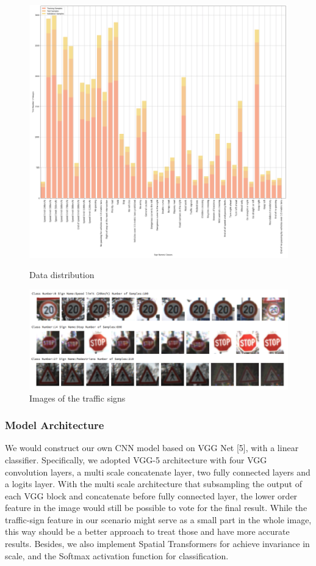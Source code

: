 \documentclass{article}
\begin{document}
\begin{figure}[ht]
  \centering
  \begin{minipage}{.5\textwidth}
    \includegraphics[width=1\linewidth]{data_distribution.png}
    \caption{Data distribution}
    \label{fig:fig_3}
  \end{minipage}
  \begin{minipage}{.4\textwidth}
    \includegraphics[width=1.5\linewidth]{signs_data.png}
    \centering
    \caption{Images of the traffic signs}
    \label{fig:fig_4}
  \end{minipage}
\end{figure}

\subsubsection{Model Architecture}
We would construct our own CNN model based on VGG Net [5], with a linear classifier. Specifically, we adopted VGG-5 architecture with four VGG convolution layers, a multi scale concatenate layer, two fully connected  layers and a logits layer. With the multi scale architecture that subsampling the output of each VGG block and concatenate before fully connected layer, the lower order feature in the image would still be possible to vote for the final result. While the traffic-sign feature in our scenario might serve as a small part in the whole image, this way should be a better approach to treat those and have more accurate results. Besides, we also implement Spatial Transformers for achieve invariance in scale, and the Softmax activation function for classification. 
\end{document}
